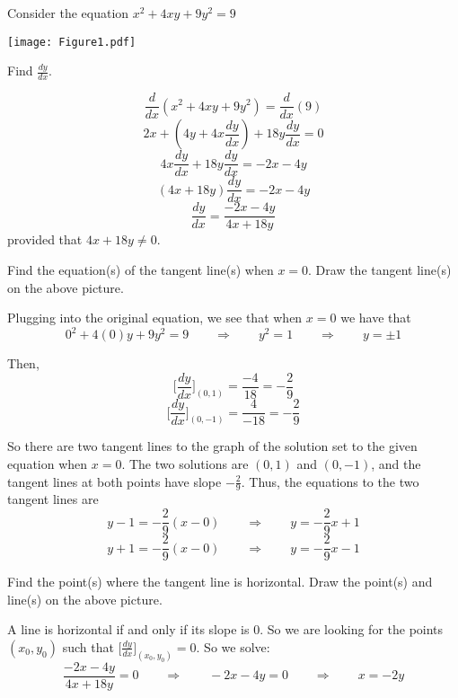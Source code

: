 \documentclass[handout]{ximera}
\newcommand{\dd}[2][]{\frac{d #1}{d #2}}
\newcommand{\ddx}{\frac{d}{dx}}
\newcommand{\eval}[1]{\bigg[ #1 \bigg]}
\renewenvironment{freeResponse}{
\ifhandout\setbox0\vbox\bgroup\else
\begin{trivlist}\item[\hskip \labelsep\bfseries Solution:\hspace{2ex}]
\fi}
{\ifhandout\egroup\else
\end{trivlist}
\fi}
\begin{document}
\begin{problem}
Consider the equation $x^2 + 4xy + 9y^2 = 9$

\begin{image}
\texttt{[image: Figure1.pdf]}
\end{image}

	\begin{enumerate}
	
	\item  Find $\dd[y]{x}$.
		\begin{freeResponse}
		$$ \ddx(x^2 + 4xy + 9y^2) = \ddx(9) $$
		$$ 2x + \left(4y + 4x \dd[y]{x} \right) + 18 y \dd[y]{x} = 0 $$
		$$ 4x \dd[y]{x} + 18y \dd[y]{x} = -2x - 4y $$
		$$ (4x+18y) \dd[y]{x} = -2x-4y $$
		$$ \dd[y]{x} = \frac{-2x-4y}{4x+18y} $$
		provided that $4x+18y \neq 0$.
		\end{freeResponse}
		
		
		
	\item  Find the equation(s) of the tangent line(s) when $x=0$.  Draw the tangent line(s) on the above picture.
		\begin{freeResponse}
		Plugging into the original equation, we see that when $x=0$ we have that 
		$$ 0^2 + 4(0)y + 9y^2 = 9 \qquad \Longrightarrow \qquad y^2 = 1 \qquad \Longrightarrow \qquad y = \pm 1 $$
		
		Then,
		$$\eval{\dd[y]{x}}_{(0,1)} = \frac{-4}{18} = -\frac{2}{9}$$
		$$\eval{\dd[y]{x}}_{(0,-1)} = \frac{4}{-18} = -\frac{2}{9} $$
		
		So there are two tangent lines to the graph of the solution set to the given equation when $x=0$.  The two solutions are $(0,1)$ and $(0,-1)$, and the tangent lines at both points have slope $-\frac{2}{9}$.  Thus, the equations to the two tangent lines are
		$$ y - 1 = -\frac{2}{9}(x-0)  \qquad \Longrightarrow \qquad y = -\frac{2}{9}x + 1 $$
		$$ y + 1 = -\frac{2}{9}(x-0) \qquad \Longrightarrow \qquad y = -\frac{2}{9}x - 1 $$
		\end{freeResponse}
		
		
		
	\item  Find the point(s) where the tangent line is horizontal.  Draw the point(s) and line(s) on the above picture.
		\begin{freeResponse}
		A line is horizontal if and only if its slope is 0.  So we are looking for the points $(x_0,y_0)$ such that $\eval{\dd[y]{x}}_{(x_0,y_0)} = 0$.  So we solve:
		$$ \frac{-2x-4y}{4x+18y} = 0\qquad \Longrightarrow \qquad -2x - 4y = 0 \qquad \Longrightarrow \qquad x=-2y$$
		

\end{freeResponse}
\end{enumerate}
\end{problem}
\end{document}
